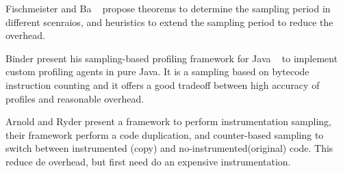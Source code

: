 \documentclass{sig-alternate}
\newcommand{\ra}{$\rightarrow$}
\newcommand{\chg}[2]{\textcolor{red}{\sout{#1}}{\ra}\textcolor{blue}{\uline{#2}}} %
\begin{document}

Fischmeister and Ba ~\cite{Fischmeister:2010:SPE:1755888.1755908} propose theorems to determine the sampling period in different scenraios, and heuristics to extend the sampling period to reduce the overhead.



Binder present his sampling-based profiling framework for Java ~\cite{Binder:2006:PAS:1133013.1133016} to implement custom profiling agents in pure Java. It is a sampling based on bytecode instruction counting and it offers a good tradeoff between high accuracy of profiles and reasonable overhead.





Arnold and Ryder present a framework to perform instrumentation sampling, their framework perform a code duplication, and counter-based sampling to switch between instrumented (copy) and no-instrumented(original) code. This reduce de overhead, but first need  do an expensive  instrumentation.
\end{document}
